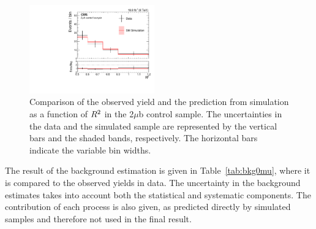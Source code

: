 \begin{figure}
  \centering
   \includegraphics[width=0.48\textwidth]{BtagPlots/MC_CP_2Mu1TbTT_Sep.pdf}
   \caption{Comparison of the observed yield and the prediction from
     simulation as a function of $R^2$ in the 2$\mu$b control
     sample. The uncertainties in the data and the simulated
     sample are represented by the vertical bars and the shaded bands,
     respectively. The horizontal bars indicate
the variable bin widths.\label{fig:2mub}}
\end{figure}
The result of the background estimation is given in
Table~\ref{tab:bkg0mu}, where it is compared to the observed yields in
data. The uncertainty in the background estimates takes into account
both the statistical and systematic components. The contribution of each process is also given,
as predicted directly by simulated samples and therefore not used in
the final result.

\begin{table}
\centering
{}
\end{table}

